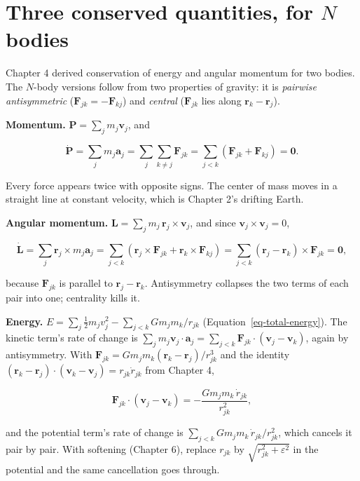 \documentclass[
  10.5pt,
  letterpaper,
]{scrbook}
\theoremstyle{definition}
\theoremstyle{plain}
\theoremstyle{remark}
\begin{document}
\section{\texorpdfstring{Three conserved quantities, for \(N\)
bodies}{Three conserved quantities, for N bodies}}\label{three-conserved-quantities-for-n-bodies}

Chapter 4 derived conservation of energy and angular momentum for two
bodies. The \(N\)-body versions follow from two properties of gravity:
it is \emph{pairwise antisymmetric}
(\(\mathbf{F}_{jk} = -\mathbf{F}_{kj}\)) and \emph{central}
(\(\mathbf{F}_{jk}\) lies along \(\mathbf{r}_k - \mathbf{r}_j\)).

\textbf{Momentum.} \(\mathbf{P} = \sum_j m_j\mathbf{v}_j\), and

\[
\dot{\mathbf{P}} = \sum_j m_j\mathbf{a}_j = \sum_j\sum_{k\ne j}\mathbf{F}_{jk} = \sum_{j<k}\left(\mathbf{F}_{jk} + \mathbf{F}_{kj}\right) = \mathbf{0}.
\]

Every force appears twice with opposite signs. The center of mass moves
in a straight line at constant velocity, which is Chapter 2's drifting
Earth.

\textbf{Angular momentum.}
\(\mathbf{L} = \sum_j m_j\,\mathbf{r}_j\times\mathbf{v}_j\), and since
\(\mathbf{v}_j\times\mathbf{v}_j = 0\),

\[
\dot{\mathbf{L}} = \sum_j \mathbf{r}_j\times m_j\mathbf{a}_j = \sum_{j<k}\left(\mathbf{r}_j\times\mathbf{F}_{jk} + \mathbf{r}_k\times\mathbf{F}_{kj}\right) = \sum_{j<k}\left(\mathbf{r}_j - \mathbf{r}_k\right)\times\mathbf{F}_{jk} = \mathbf{0},
\]

because \(\mathbf{F}_{jk}\) is parallel to
\(\mathbf{r}_j - \mathbf{r}_k\). Antisymmetry collapses the two terms of
each pair into one; centrality kills it.

\textbf{Energy.}
\(E = \sum_j \tfrac12 m_j v_j^2 - \sum_{j<k} G m_j m_k/r_{jk}\)
(Equation~\ref{eq-total-energy}). The kinetic term's rate of change is
\(\sum_j m_j\mathbf{v}_j\cdot\mathbf{a}_j = \sum_{j<k}\mathbf{F}_{jk}\cdot(\mathbf{v}_j - \mathbf{v}_k)\),
again by antisymmetry. With
\(\mathbf{F}_{jk} = G m_j m_k(\mathbf{r}_k - \mathbf{r}_j)/r_{jk}^3\)
and the identity
\((\mathbf{r}_k - \mathbf{r}_j)\cdot(\mathbf{v}_k - \mathbf{v}_j) = r_{jk}\dot r_{jk}\)
from Chapter 4,

\[
\mathbf{F}_{jk}\cdot(\mathbf{v}_j - \mathbf{v}_k) = -\frac{G m_j m_k\,\dot r_{jk}}{r_{jk}^2},
\]

and the potential term's rate of change is
\(\sum_{j<k} G m_j m_k\,\dot r_{jk}/r_{jk}^2\), which cancels it pair by
pair. With softening (Chapter 6), replace \(r_{jk}\) by
\(\sqrt{r_{jk}^2+\varepsilon^2}\) in the potential and the same
cancellation goes through.
\end{document}
